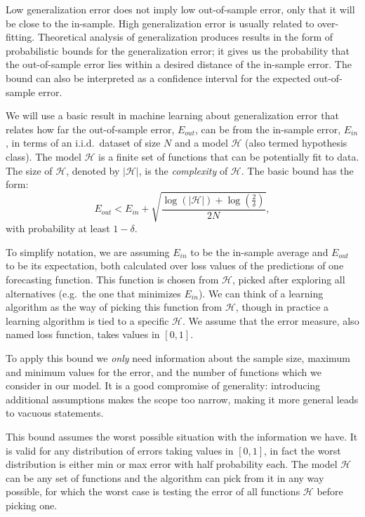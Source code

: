 \documentclass[a4paper]{article}
\theoremstyle{custom}
\begin{document}
Low generalization error does not imply low out-of-sample error, only that it will be close to the in-sample. High generalization error is usually related to over-fitting. Theoretical analysis of generalization produces results in the form of probabilistic bounds for the generalization error; it gives us the probability that the out-of-sample error lies within a desired distance of the in-sample error. The bound can also be interpreted as a confidence interval for the expected out-of-sample error.

We will use a basic result in machine learning about generalization error \cite{abu2012learning} that relates how far the out-of-sample error, $E_{\textit{out}}$, can be from the in-sample error,
$E_{\textit{in}}$, in terms of an i.i.d.\ dataset of size $N$ and a model $\mathcal{H}$ (also termed hypothesis class).
The model $\mathcal{H}$ is a finite set of functions that can be potentially fit to data.
The size of $\mathcal{H}$, denoted by $|\mathcal{H}|$, is the \textit{complexity} of $\mathcal{H}$.
The basic bound has the form:
$$
  E_{\textit{out}} < E_{\textit{in}} +  \sqrt{ \frac{\log(|\mathcal{H}|) + \log(\frac{2}{\delta})}{2N}},
$$
with probability at least $1 - \delta$.

To simplify notation, we are assuming $E_{\textit{in}}$ to be the in-sample average and $E_{\textit{out}}$ to be its expectation, both calculated over loss values of the predictions of one forecasting function.
This function is chosen from $\mathcal{H}$, picked after exploring all alternatives (e.g.\ the one that minimizes $E_{\textit{in}}$). We can think of a learning algorithm as the way of picking this function from $\mathcal{H}$, though in practice a learning algorithm is tied to a specific $\mathcal{H}$. We assume that the error measure, also named loss function, takes values in $[0,1]$.

To apply this bound we \textit{only} need information about the sample size, maximum and minimum values for the error, and the number of functions which we consider in our model. It is a good compromise of generality: introducing additional assumptions makes the scope too narrow, making it more general leads to vacuous statements.

This bound assumes the worst possible situation with the information we have. It is valid for any distribution of errors taking values in $[0,1]$, in fact the worst distribution is either min or max error with half probability each. The model $\mathcal{H}$ can be any set of functions and the algorithm can pick from it in any way possible, for which the worst case is testing the error of all functions $\mathcal{H}$ before picking one.
\end{document}
